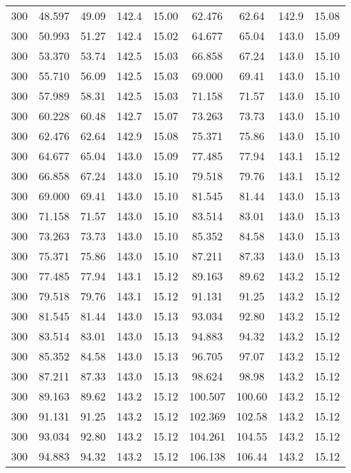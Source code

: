 \documentclass[captions=tableheading]{scrartcl}
\begin{document}
\begin{table}
\begin{tabular}{c c c c c c c c c}
     300 &  48.597&   49.09 & 142.4 & 15.00 &   62.476 &  62.64 & 142.9 & 15.08\\
     300 &  50.993&   51.27 & 142.4 & 15.02 &   64.677 &  65.04 & 143.0 & 15.09\\
     300 &  53.370&   53.74 & 142.5 & 15.03 &   66.858 &  67.24 & 143.0 & 15.10\\
     300 &  55.710&   56.09 & 142.5 & 15.03 &   69.000 &  69.41 & 143.0 & 15.10\\
     300 &  57.989&   58.31 & 142.5 & 15.03 &   71.158 &  71.57 & 143.0 & 15.10\\
     300 &  60.228&   60.48 & 142.7 & 15.07 &   73.263 &  73.73 & 143.0 & 15.10\\
     300 &  62.476&   62.64 & 142.9 & 15.08 &   75.371 &  75.86 & 143.0 & 15.10\\
     300 &  64.677&   65.04 & 143.0 & 15.09 &   77.485 &  77.94 & 143.1 & 15.12\\
     300 &  66.858&   67.24 & 143.0 & 15.10 &   79.518 &  79.76 & 143.1 & 15.12\\
     300 &  69.000&   69.41 & 143.0 & 15.10 &   81.545 &  81.44 & 143.0 & 15.13\\
     300 &  71.158&   71.57 & 143.0 & 15.10 &   83.514 &  83.01 & 143.0 & 15.13\\
     300 &  73.263&   73.73 & 143.0 & 15.10 &   85.352 &  84.58 & 143.0 & 15.13\\
     300 &  75.371&   75.86 & 143.0 & 15.10 &   87.211 &  87.33 & 143.0 & 15.13\\
     300 &  77.485&   77.94 & 143.1 & 15.12 &   89.163 &  89.62 & 143.2 & 15.12\\
     300 &  79.518&   79.76 & 143.1 & 15.12 &   91.131 &  91.25 & 143.2 & 15.12\\
     300 &  81.545&   81.44 & 143.0 & 15.13 &   93.034 &  92.80 & 143.2 & 15.12\\
     300 &  83.514&   83.01 & 143.0 & 15.13 &   94.883 &  94.32 & 143.2 & 15.12\\
     300 &  85.352&   84.58 & 143.0 & 15.13 &   96.705 &  97.07 & 143.2 & 15.12\\
     300 &  87.211&   87.33 & 143.0 & 15.13 &   98.624 &  98.98 & 143.2 & 15.12\\
     300 &  89.163&   89.62 & 143.2 & 15.12 &  100.507 & 100.60 & 143.2 & 15.12\\
     300 &  91.131&   91.25 & 143.2 & 15.12 &  102.369 & 102.58 & 143.2 & 15.12\\
     300 &  93.034&   92.80 & 143.2 & 15.12 &  104.261 & 104.55 & 143.2 & 15.12\\
     300 &  94.883&   94.32 & 143.2 & 15.12 &  106.138 & 106.44 & 143.2 & 15.12\\
     \bottomrule
  \end{tabular}
\end{table}
\end{document}
